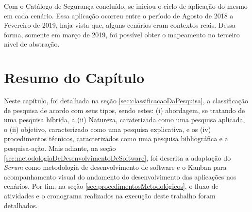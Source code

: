 Com o Catálogo de Segurança concluído, se iniciou o ciclo de aplicação do mesmo em cada cenário. Essa aplicação ocorreu entre o período de Agosto de 2018 a Fevereiro de 2019, haja vista que, alguns cenários eram contextos reais. Dessa forma, somente em março de 2019, foi possível obter o mapeamento no terceiro nível de abstração.

\section{Resumo do Capítulo}

Neste capítulo, foi detalhada na seção \ref{sec:classificacaoDaPesquisa}, a classificação de pesquisa de acordo com seus tipos, sendo estes: (i) abordagem, se tratando de uma pesquisa híbrida, a (ii) Natureza, caraterizada como uma pesquisa aplicada, o (ii) objetivo, caracterizado como uma pesquisa explicativa, e os (iv) procedimentos técnicos, caracterizados como uma pesquisa bibliográfica e a pesquisa-ação. Mais adiante, na seção \ref{sec:metodologiaDeDesenvolvimentoDeSoftware}, foi descrita a adaptação do \textit{Scrum} como metodologia de desenvolvimento de software e o Kanban para acompanhamento visual do andamento do desenvolvimento das aplicações nos cenários. Por fim, na seção \ref{sec:procedimentosMetodológicos}, o fluxo de atividades e o cronograma realizados na execução deste trabalho foram detalhados.

